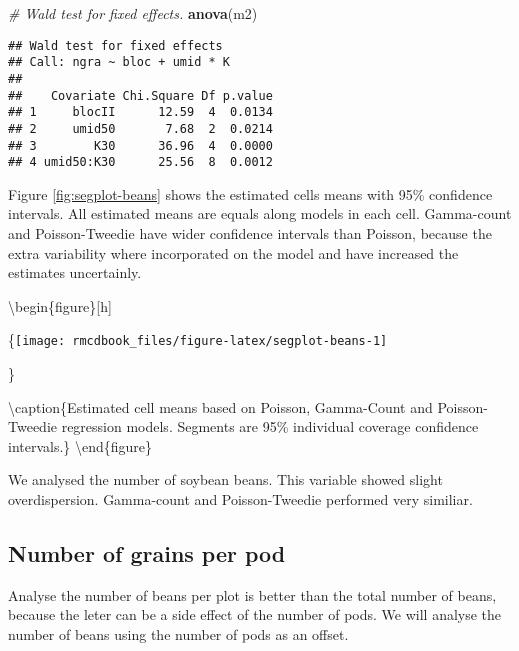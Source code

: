 \documentclass[9pt,a5paper,]{book}
\newenvironment{Shaded}{}{}
\newcommand{\KeywordTok}[1]{\textbf{{#1}}}
\newcommand{\CommentTok}[1]{\textit{{#1}}}
\newcommand{\NormalTok}[1]{{#1}}
\renewenvironment{Shaded}{\color{inputcolor}}{}
\theoremstyle{definition}
\theoremstyle{definition}
\theoremstyle{remark}
\begin{document}
\begin{Shaded}
\begin{Highlighting}[]
\CommentTok{# Wald test for fixed effects.}
\KeywordTok{anova}\NormalTok{(m2)}
\end{Highlighting}
\end{Shaded}

\begin{verbatim}
## Wald test for fixed effects
## Call: ngra ~ bloc + umid * K
## 
##    Covariate Chi.Square Df p.value
## 1     blocII      12.59  4  0.0134
## 2     umid50       7.68  2  0.0214
## 3        K30      36.96  4  0.0000
## 4 umid50:K30      25.56  8  0.0012
\end{verbatim}

Figure \ref{fig:segplot-beans} shows the estimated cells means with 95\%
confidence intervals. All estimated means are equals along models in
each cell. Gamma-count and Poisson-Tweedie have wider confidence
intervals than Poisson, because the extra variability where incorporated
on the model and have increased the estimates uncertainly.

\textbackslash{}begin\{figure\}{[}h{]}

\{\centering \texttt{[image: rmcdbook\_files/figure-latex/segplot-beans-1]}

\}

\textbackslash{}caption\{Estimated cell means based on Poisson,
Gamma-Count and Poisson-Tweedie regression models. Segments are 95\%
individual coverage confidence intervals.\}\label{fig:segplot-beans}
\textbackslash{}end\{figure\}

We analysed the number of soybean beans. This variable showed slight
overdispersion. Gamma-count and Poisson-Tweedie performed very similiar.

\subsection{Number of grains per pod}\label{number-of-grains-per-pod}

Analyse the number of beans per plot is better than the total number of
beans, because the leter can be a side effect of the number of pods. We
will analyse the number of beans using the number of pods as an offset.
\end{document}

